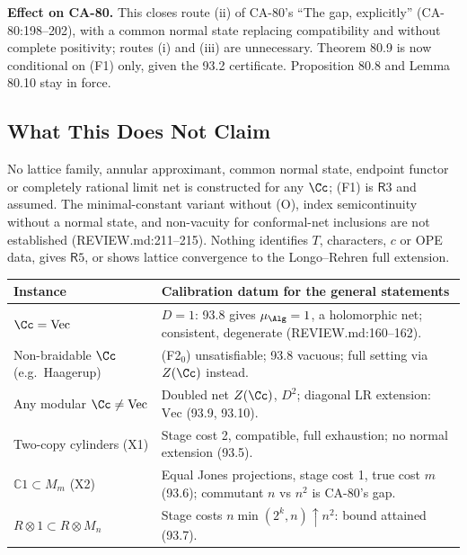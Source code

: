 \textbf{Effect on CA-80.}  This closes route (ii) of CA-80's ``The gap, explicitly'' (CA-80:198--202), with a common
normal state replacing compatibility and without complete positivity; routes (i) and (iii) are unnecessary.  Theorem 80.9
is now conditional on (F1) only, given the 93.2 certificate.  Proposition 80.8 and Lemma 80.10 stay in force.

\subsection{What This Does Not Claim}

No lattice family, annular approximant, common normal state, endpoint functor or completely rational limit net is
constructed for any \(\Cc\); (F1) is \(\mathsf R3\) and assumed.  The minimal-constant variant without (O), index
semicontinuity without a normal state, and non-vacuity for conformal-net inclusions are not established
(REVIEW.md:211--215).  Nothing identifies \(T\), characters, \(c\) or OPE data, gives \(\mathsf R5\), or shows lattice convergence to
the Longo--Rehren full extension.

\begin{center}\footnotesize
\begin{tabular}{p{3.6cm}p{10.4cm}}
\toprule
Instance & Calibration datum for the general statements \\
\midrule
\(\Cc=\mathrm{Vec}\) & \(D=1\): 93.8 gives \(\mu_\Alg=1\), a holomorphic net; consistent, degenerate (REVIEW.md:160--162). \\
Non-braidable \(\Cc\) (e.g.\ Haagerup) & (F2\(_0\)) unsatisfiable; 93.8 vacuous; full setting via \(Z(\Cc)\) instead. \\
Any modular \(\Cc\ne\mathrm{Vec}\) & Doubled net \(Z(\Cc)\), \(D^2\); diagonal LR extension: \(\mathrm{Vec}\) (93.9, 93.10). \\
Two-copy cylinders (X1) & Stage cost 2, compatible, full exhaustion; no normal extension (93.5). \\
\(\mathbb C1\subset M_m\) (X2) & Equal Jones projections, stage cost 1, true cost \(m\) (93.6); commutant \(n\) vs \(n^2\) is CA-80's gap. \\
\(R\otimes1\subset R\otimes M_n\) & Stage costs \(n\min(2^k,n)\uparrow n^2\): bound attained (93.7). \\
\bottomrule
\end{tabular}
\end{center}
